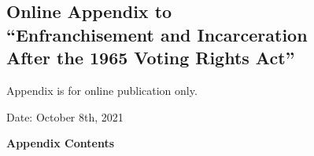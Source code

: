 \documentclass[12pt]{article}
\begin{document}

\normalsize

\appendix




\clearpage

\begin{center}
\singlespacing
	\section*{\normalfont \LARGE Online Appendix to \\``Enfranchisement and Incarceration \\ After the 1965 Voting Rights Act''}

	\normalsize
	\vspace{.2in}
	{Appendix is for online publication only.}


	\large
	\vspace{.25in}
	Date: October 8th, 2021

\end{center}


\vspace{.2in}
\singlespacing
\normalsize

\setcounter{footnote}{0}
\setcounter{equation}{0}

\renewcommand{\thesubsection}{\Alph{subsection}}

\singlespacing
\noindent \textbf{Appendix Contents} \\
\end{document}

